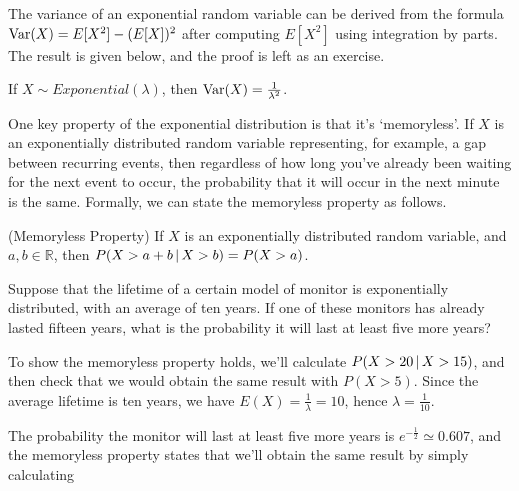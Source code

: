 \par
The variance of an exponential random variable can be derived from the formula $\operatorname{Var}(X) = E[X^2] - (E[X])^2$ after computing $E[X^2]$ using integration by parts. The result is given below, and the proof is left as an exercise.
\begin{prop} If $X \sim Exponential(\lambda)$, then $\operatorname{Var}(X) = \frac{1}{\lambda^2}$.
\end{prop}
\par
One key property of the exponential distribution is that it's `memoryless'. If $X$ is an exponentially distributed random variable representing, for example, a gap between recurring events, then regardless of how long you've already been waiting for the next event to occur, the probability that it will occur in the next minute is the same. Formally, we can state the memoryless property as follows.
\begin{prop} (Memoryless Property) If $X$ is an exponentially distributed random variable, and $a,b \in \mathbb{R}$, then $P(X > a+b \,|\, X>b) = P(X > a)$.
\end{prop}
\begin{examp} Suppose that the lifetime of a certain model of monitor is exponentially distributed, with an average of ten years. If one of these monitors has already lasted fifteen years, what is the probability it will last at least five more years?
\par
\noindent To show the memoryless property holds, we'll calculate $P(X > 20 \,|\, X > 15)$, and then check that we would obtain the same result with $P(X > 5)$. Since the average lifetime is ten years, we have $E(X) = \frac{1}{\lambda} = 10$, hence $\lambda = \frac{1}{10}$. 
\par
\noindent The probability the monitor will last at least five more years is $e^{-\frac{1}{2}} \simeq 0.607$, and the memoryless property states that we'll obtain the same result by simply calculating 
\end{examp}

